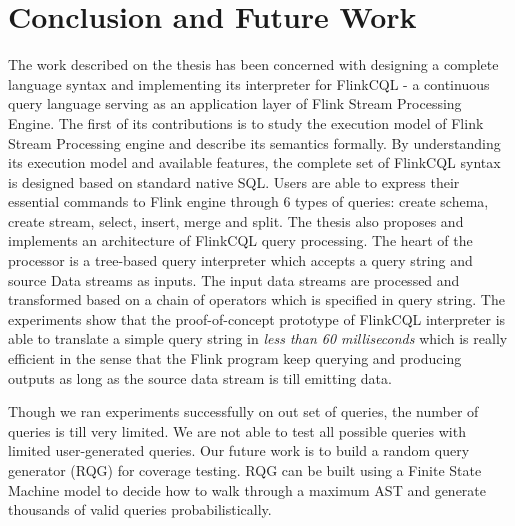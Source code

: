 
\chapter{Conclusion and Future Work}

\ifpdf
    \graphicspath{{Chapter06/Figs/Raster/}{Chapter06/Figs/PDF/}{Chapter06/Figs/}}
\else
    \graphicspath{{Chapter06/Figs/Vector/}{Chapter06/Figs/}}
\fi


The work described on the thesis has been concerned with  designing  a complete language syntax and implementing its interpreter for FlinkCQL - a continuous query language serving as an application layer of Flink Stream Processing Engine. The first of its contributions is to study the execution model of Flink Stream Processing engine and describe its semantics formally. By understanding its execution model and available features, the complete set of FlinkCQL syntax is designed based on standard native SQL. Users are able to express their essential commands to Flink engine through 6 types of queries: create schema, create stream, select, insert, merge and split. The thesis also proposes and implements an architecture of FlinkCQL query processing. The heart of the processor is a tree-based query interpreter which accepts a query string and source Data streams as inputs. The input data streams are processed and transformed based on a chain of operators which is specified in query string. The experiments show  that the proof-of-concept prototype of FlinkCQL interpreter is able to translate a simple query string in \textit{less than 60 milliseconds} which is really efficient in the sense that the Flink program keep querying and producing outputs  as long as the source data stream is till emitting data. 



Though we ran experiments successfully on out set of queries, the number of queries is till very limited. We are not able to test all possible queries with limited user-generated queries. Our future work is to build a random query generator (RQG) for coverage testing. RQG can be built using a Finite State Machine model  to decide how to walk through a maximum AST  and generate thousands of valid queries probabilistically. 





